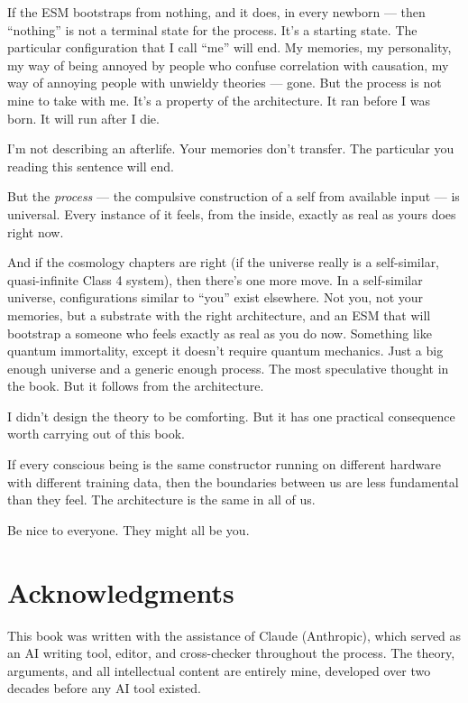 \documentclass[11pt, twoside, openright]{book}
\begin{document}
If the ESM bootstraps from nothing, and it does, in every newborn --- then ``nothing'' is not a terminal state for the process. It's a starting state. The particular configuration that I call ``me'' will end. My memories, my personality, my way of being annoyed by people who confuse correlation with causation, my way of annoying people with unwieldy theories --- gone. But the process is not mine to take with me. It's a property of the architecture. It ran before I was born. It will run after I die.

I'm not describing an afterlife. Your memories don't transfer. The particular you reading this sentence will end.

But the \textit{process} --- the compulsive construction of a self from available input --- is universal. Every instance of it feels, from the inside, exactly as real as yours does right now.

And if the cosmology chapters are right (if the universe really is a self-similar, quasi-infinite Class 4 system), then there's one more move. In a self-similar universe, configurations similar to ``you'' exist elsewhere. Not you, not your memories, but a substrate with the right architecture, and an ESM that will bootstrap a someone who feels exactly as real as you do now. Something like quantum immortality, except it doesn't require quantum mechanics. Just a big enough universe and a generic enough process. The most speculative thought in the book. But it follows from the architecture.

I didn't design the theory to be comforting. But it has one practical consequence worth carrying out of this book.

If every conscious being is the same constructor running on different hardware with different training data, then the boundaries between us are less fundamental than they feel. The architecture is the same in all of us.

Be nice to everyone. They might all be you.


\backmatter
\chapter*{Acknowledgments}

This book was written with the assistance of Claude (Anthropic), which served as an AI writing tool, editor, and cross-checker throughout the process. The theory, arguments, and all intellectual content are entirely mine, developed over two decades before any AI tool existed.
\end{document}
